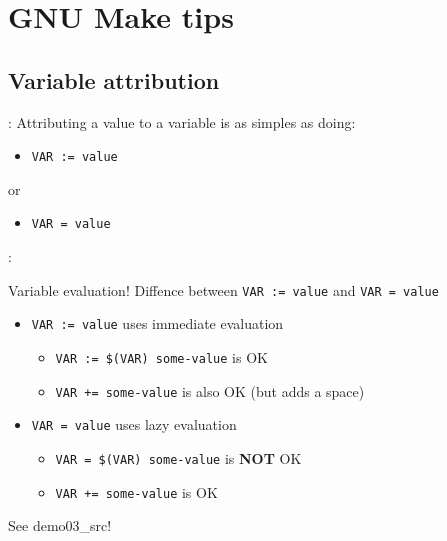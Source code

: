 \section{GNU Make tips}

\subsection{Variable attribution}
\begin{frame}{\secname: \small\subsecname\normalsize}
    Attributing a value to a variable is as simples as doing:

    \begin{itemize}
        \item \texttt{VAR := value}
    \end{itemize}

    or

    \begin{itemize}
        \item \texttt{VAR = value}
    \end{itemize}
\end{frame}

\begin{frame}{\secname: \small\subsecname\normalsize}
    \begin{block}{Variable evaluation!}
        Diffence between \texttt{VAR := value} and \texttt{VAR = value}
    \end{block}

    \begin{itemize}
        \item \texttt{VAR := value} uses immediate evaluation
        \begin{itemize}
            \item \texttt{VAR := \$(VAR) some-value} is OK
            \item \texttt{VAR += some-value} is also OK (but adds a space)
        \end{itemize}
        \item \texttt{VAR = value} uses lazy evaluation
        \begin{itemize}
            \item \texttt{VAR = \$(VAR) some-value} is \textbf{NOT} OK
            \item \texttt{VAR += some-value} is OK
        \end{itemize}
    \end{itemize}

    See demo03\_src!

\end{frame}
